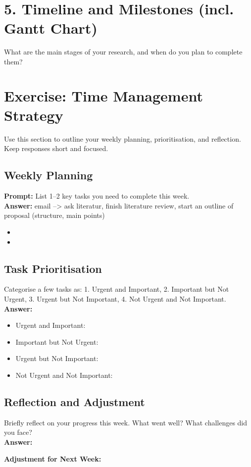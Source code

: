 \documentclass[a4paper,12pt]{article}
\begin{document}
\section{5. Timeline and Milestones (incl. Gantt Chart)}
What are the main stages of your research, and when do you plan to complete them?\\

\section{Exercise: Time Management Strategy}
Use this section to outline your weekly planning, prioritisation, and reflection. Keep responses short and focused.

\subsection*{Weekly Planning}
\textbf{Prompt:} List 1–2 key tasks you need to complete this week.\\
\textbf{Answer:}  email --> ask literatur, finish literature review, start an outline of proposal (structure, main points)
\begin{itemize}
    \item 
    \item 
\end{itemize}

\subsection*{Task Prioritisation}
 Categorise a few tasks as: 1. Urgent and Important, 2. Important but Not Urgent, 3. Urgent but Not Important, 4. Not Urgent and Not Important.\\
\textbf{Answer:}
\begin{itemize}
    \item Urgent and Important: 
    \item Important but Not Urgent: 
    \item Urgent but Not Important: 
    \item Not Urgent and Not Important: 
\end{itemize}

\subsection*{Reflection and Adjustment}
Briefly reflect on your progress this week. What went well? What challenges did you face?\\
\textbf{Answer:} 

\noindent
\textbf{Adjustment for Next Week:} 
\end{document}
